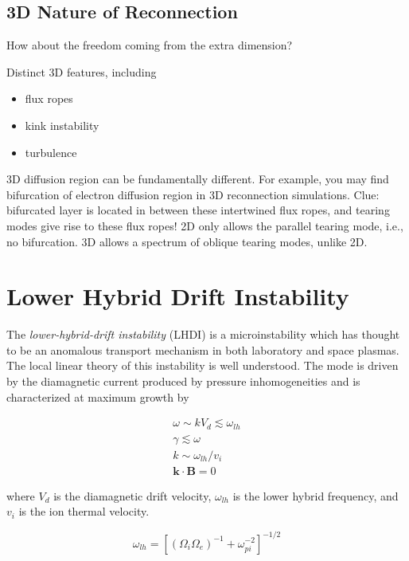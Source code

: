 \documentclass[
  notoc %
]{tufte-book}
\providecommand{\tightlist}{%
  \setlength{\itemsep}{0pt}\setlength{\parskip}{0pt}
}
\begin{document}
\hypertarget{d-nature-of-reconnection}{%
\subsection{3D Nature of Reconnection}\label{d-nature-of-reconnection}}

How about the freedom coming from the extra dimension?

Distinct 3D features, including

\begin{itemize}
\tightlist
\item
  flux ropes
\item
  kink instability
\item
  turbulence
\end{itemize}

3D diffusion region can be fundamentally different. For example, you may
find bifurcation of electron diffusion region in 3D reconnection
simulations. Clue: bifurcated layer is located in between these
intertwined flux ropes, and tearing modes give rise to these flux ropes!
2D only allows the parallel tearing mode, i.e., no bifurcation. 3D
allows a spectrum of oblique tearing modes, unlike 2D.

\hypertarget{sec:LHDI}{%
\section{Lower Hybrid Drift Instability}\label{sec:LHDI}}

The \emph{lower-hybrid-drift instability} (LHDI) is a microinstability
which has thought to be an anomalous transport mechanism in both
laboratory and space plasmas. The local linear theory of this
instability is well understood. The mode is driven by the diamagnetic
current produced by pressure inhomogeneities and is characterized at
maximum growth by

\[
\begin{aligned}
\omega\sim kV_d \lesssim \omega_{lh} \\
\gamma\lesssim \omega \\
k \sim \omega_{lh}/v_i \\
\mathbf{k}\cdot\mathbf{B}=0
\end{aligned}
\]

where \(V_d\) is the diamagnetic drift velocity, \(\omega_{lh}\) is the
lower hybrid frequency, and \(v_i\) is the ion thermal velocity.

\[
\omega_{lh} = [(\Omega_i \Omega_e)^{-1} + \omega_{pi}^{-2}]^{-1/2}
\]
\end{document}
